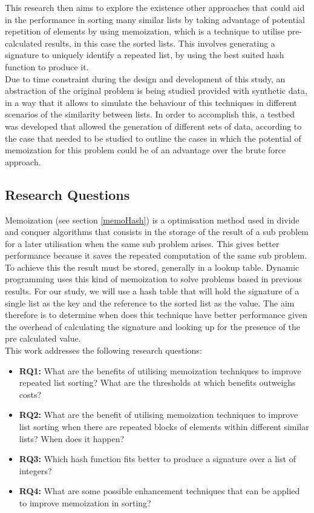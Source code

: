 \documentclass[a4paper,12pt]{article}
\begin{document}
This research then aims to explore the existence other approaches that could aid in the performance in sorting many similar lists by taking advantage of potential repetition of elements by using memoization, which is a technique to utilise pre-calculated results, in this case the sorted lists. This involves generating a signature to uniquely identify a repeated list, by using the best suited hash function to produce it.
\\

Due to time constraint during the design and development of this study, an abstraction of the original problem is being studied provided with synthetic data, in a way that it allows to simulate the behaviour of this techniques in different scenarios of the similarity between lists. In order to accomplish this, a testbed was developed that allowed the generation of different sets of data, according to the case that needed to be studied to outline the cases in which the potential of memoization for this problem could be of an advantage over the brute force approach.

\subsection*{Research Questions}  \label{researchQuestions}
Memoization (see section \ref{memoHash}) is a optimisation method used in divide and conquer algorithms that consists in the storage of the result of a sub problem for a later utilisation when the same sub problem arises. This gives better performance because it saves the repeated computation of the same sub problem. To achieve this the result must be stored, generally in a lookup table. Dynamic programming uses this kind of memoization to solve problems based in previous results. For our study, we will use a hash table that will hold the signature of a single list as the key and the reference to the sorted list as the value. The aim therefore is to determine when does this technique have better performance given the overhead of calculating the signature and looking up for the presence of the pre calculated value.\\

This work addresses the following research questions:

\begin{itemize}
\item {\bf RQ1:} What are the benefits of utilising memoization techniques to improve repeated list sorting? What are the thresholds at which benefits outweighs costs?
\item {\bf RQ2:} What are the benefit of utilising memoization techniques to improve list sorting when there are repeated blocks of elements within different similar lists? When does it happen?
\item {\bf RQ3:} Which hash function fits better to produce a signature over a list of integers?
\item {\bf RQ4:} What are some possible enhancement techniques that can be applied to improve memoization in sorting?
\end{itemize}
\end{document}
